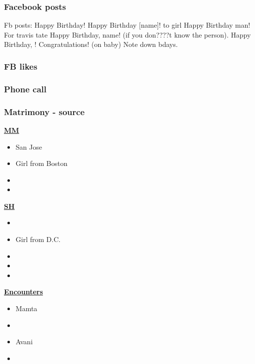 \begin{frame}[label=fbposts]
\frametitle{Facebook posts} 
Fb posts: Happy Birthday! Happy Birthday [name]! to girl Happy
Birthday man! For travis tate  Happy Birthday, name! (if you don????t
know the person).  Happy Birthday, !  Congratulations! (on baby) Note
down bdays.  

\end{frame} 

\begin{frame}
\frametitle{FB likes} 
\end{frame} 

\begin{frame} 
\frametitle{Phone call} 
\end{frame}


\begin{frame}
\frametitle{Matrimony - source}

{\small \underline{\bf MM} } \\
\begin{itemize} 
\tiny \item \tiny San Jose 
\item \tiny Girl from Boston 
\item \tiny 
\item \tiny 
\end{itemize} 

{\small \underline{\bf SH}} \\
\begin{itemize} 
\tiny \item \tiny 
\item \tiny Girl from D.C.
\item \tiny 
\item \tiny 
\item \tiny 
\end{itemize} 

{\small \underline{\bf Encounters}} \\
\begin{itemize} 
\tiny \item \tiny Mamta 
\item \tiny
\item \tiny Avani
\item \tiny 
\end{itemize} 


\end{frame}



